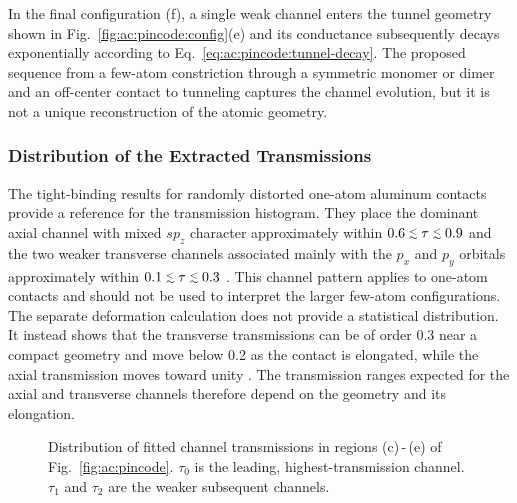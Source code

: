         In the final configuration (f), a single weak channel enters the tunnel geometry shown in Fig.~\ref{fig:ac:pincode:config}(e) and its conductance subsequently decays exponentially according to Eq.~\eqref{eq:ac:pincode:tunnel-decay}. The proposed sequence from a few-atom constriction through a symmetric monomer or dimer and an off-center contact to tunneling captures the channel evolution, but it is not a unique reconstruction of the atomic geometry.

    \subsubsection*{Distribution of the Extracted Transmissions}

        The tight-binding results for randomly distorted one-atom aluminum contacts provide a reference for the transmission histogram. They place the dominant axial channel with mixed $sp_z$ character approximately within $0.6\slesssim\tau\slesssim0.9$ and the two weaker transverse channels associated mainly with the $p_x$ and $p_y$ orbitals approximately within $0.1\slesssim\tau\slesssim0.3$ \cite{cuevas_microscopic_1998}. This channel pattern applies to one-atom contacts and should not be used to interpret the larger few-atom configurations. The separate deformation calculation does not provide a statistical distribution. It instead shows that the transverse transmissions can be of order 0.3 near a compact geometry and move below 0.2 as the contact is elongated, while the axial transmission moves toward unity \cite{cuevas_evolution_1998}. The transmission ranges expected for the axial and transverse channels therefore depend on the geometry and its elongation.

        \begin{figure}
            \captionsetup{format=plain}%
            \centering
            \vspace{-1.5em}
            \caption{
                Distribution of fitted channel transmissions in regions (c)\,-\,(e) of Fig.~\ref{fig:ac:pincode}. $\tau_0$ is the leading, highest-transmission channel. $\tau_1$ and $\tau_2$ are the weaker subsequent channels.
            }
            \label{fig:ac:pincode:histogram}
        \end{figure}

